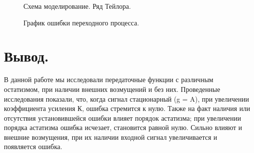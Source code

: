 \documentclass[a4paper, 11pt]{article}
\begin{document}
\newpage 

\begin{figure}[h!]
    \caption{Схема моделирование. Ряд Тейлора.}
    \label{tree}
\end{figure}

\begin{figure}[h]
    \caption{График ошибки переходного процесса.}
    \label{tree}
\end{figure}

\section*{Вывод.} В данной работе мы исследовали передаточные функции с различным остатизмом, при наличии внешних возмущений и без них. Проведенные исследования показали, что, когда сигнал стационарный (g = A), при увеличении коэффициента усиления К, ошибка стремится к нулю. Также на факт наличия или отсутствия установившейся ошибки влияет порядок астатизма; при увеличении порядка астатизма ошибка исчезает, становится равной нулю. Сильно влияют и внешние возмущения, при их наличии входной сигнал увеличивается и появляется ошибка.
\end{document}
